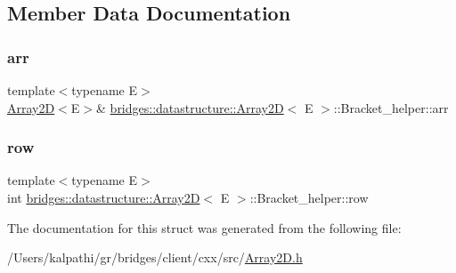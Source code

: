 \subsection{Member Data Documentation}
\mbox{\label{structbridges_1_1datastructure_1_1_array2_d_1_1_bracket__helper_a77fc2a11bc16c90eadfc0369c6f2979b}} 
\subsubsection{\texorpdfstring{arr}{arr}}
{\footnotesize\ttfamily template$<$typename E$>$ \\
\mbox{\hyperlink{classbridges_1_1datastructure_1_1_array2_d}{Array2D}}$<$E$>$\& \mbox{\hyperlink{classbridges_1_1datastructure_1_1_array2_d}{bridges\+::datastructure\+::\+Array2D}}$<$ E $>$\+::Bracket\+\_\+helper\+::arr}

\mbox{\label{structbridges_1_1datastructure_1_1_array2_d_1_1_bracket__helper_a6f09a65776d572d4fdfedb6c3a822e2a}} 
\subsubsection{\texorpdfstring{row}{row}}
{\footnotesize\ttfamily template$<$typename E$>$ \\
int \mbox{\hyperlink{classbridges_1_1datastructure_1_1_array2_d}{bridges\+::datastructure\+::\+Array2D}}$<$ E $>$\+::Bracket\+\_\+helper\+::row}



The documentation for this struct was generated from the following file\+:\begin{DoxyCompactItemize}
\item 
/\+Users/kalpathi/gr/bridges/client/cxx/src/\mbox{\hyperlink{_array2_d_8h}{Array2\+D.\+h}}\end{DoxyCompactItemize}
